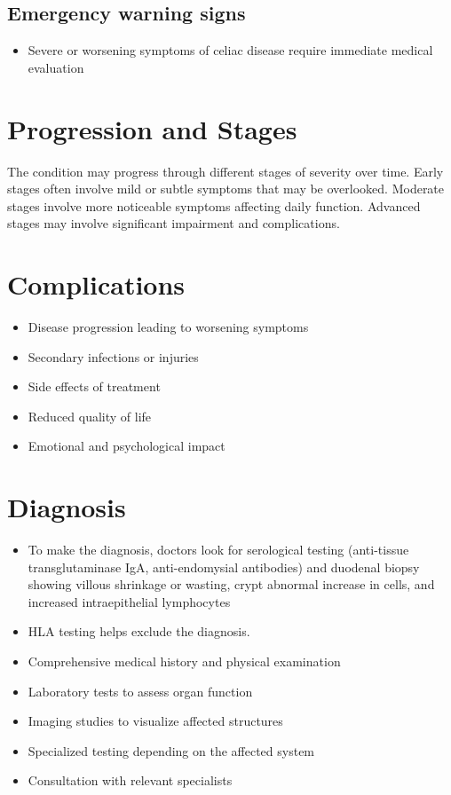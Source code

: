 \subsection{Emergency warning signs}
\begin{itemize}[noitemsep]
  \item Severe or worsening symptoms of celiac disease require immediate medical evaluation
\end{itemize}
\section{Progression and Stages}
The condition may progress through different stages of severity over time. Early stages often involve mild or subtle symptoms that may be overlooked. Moderate stages involve more noticeable symptoms affecting daily function. Advanced stages may involve significant impairment and complications.
\section{Complications}
\begin{itemize}[noitemsep]
  \item Disease progression leading to worsening symptoms
  \item Secondary infections or injuries
  \item Side effects of treatment
  \item Reduced quality of life
  \item Emotional and psychological impact
\end{itemize}
\section{Diagnosis}
\begin{itemize}[noitemsep]
  \item To make the diagnosis, doctors look for serological testing (anti-tissue transglutaminase IgA, anti-endomysial antibodies) and duodenal biopsy showing villous shrinkage or wasting, crypt abnormal increase in cells, and increased intraepithelial lymphocytes
  \item HLA testing helps exclude the diagnosis.
  \item Comprehensive medical history and physical examination
  \item Laboratory tests to assess organ function
  \item Imaging studies to visualize affected structures
  \item Specialized testing depending on the affected system
  \item Consultation with relevant specialists
\end{itemize}
